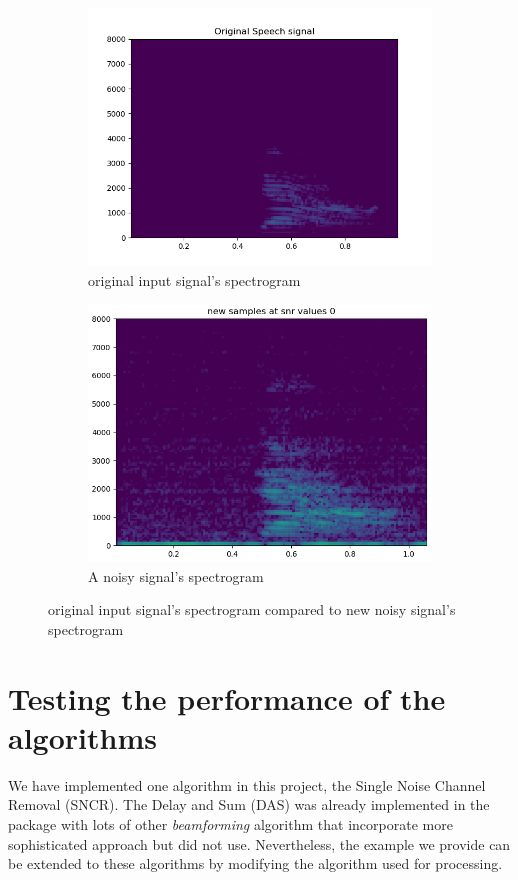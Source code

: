 \documentclass[11pt,a4paper,titlepage]{report}
\begin{document}
\begin{figure}[h!]
	\centering
	\begin{subfigure}{.5\textwidth}
		\centering
		\includegraphics[width=0.91\linewidth]{rapport12}
		\caption{original input signal's spectrogram}
		\label{fig:sub1}
	\end{subfigure}%
	\begin{subfigure}{.5\textwidth}
		\centering
		\includegraphics[width=0.91\linewidth]{rapport13}
		\caption{A noisy signal's spectrogram}
		\label{fig:sub2}
	\end{subfigure}
	\caption{original input signal's spectrogram compared to new noisy signal's spectrogram }
	\label{fig:rapport11}
\end{figure}
\section{Testing the performance of the algorithms}
\label{sec:test}
\hspace*{0.6cm}
We have implemented one algorithm in this project, the Single Noise Channel Removal (SNCR). The Delay and Sum (DAS) was already implemented in the package with lots of other \emph{beamforming} algorithm that incorporate more sophisticated approach but did not use. Nevertheless, the example we provide can be extended to these algorithms by modifying the algorithm used for processing.\\
\end{document}
